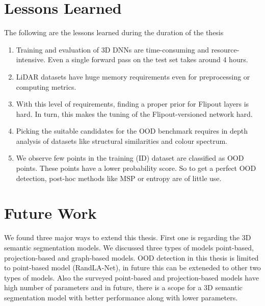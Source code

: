     \section{Lessons Learned}
    The following are the lessons learned during the duration of the thesis
    \begin{enumerate}
        \item Training and evaluation of 3D DNNs are time-consuming and resource-intensive. Even a single forward pass on the test set takes around 4 hours.
        \item LiDAR datasets have huge memory requirements even for preprocessing or computing metrics.
        \item With this level of requirements, finding a proper prior for Flipout layers is hard. In turn, this makes the tuning of the Flipout-versioned network hard.
        \item Picking the suitable candidates for the OOD benchmark requires in depth analysis of datasets like structural similarities and colour spectrum.
        \item We observe few points in the training (ID) dataset are classified as OOD points. These points have a lower probability score. So to get a perfect OOD detection, post-hoc methods like MSP or entropy are of little use.
    \end{enumerate}

    \section{Future Work}
    
    We found three major ways to extend this thesis. 
    First one is regarding the 3D semantic segmentation models.
    We discussed three types of models point-based, projection-based and graph-based models.
    OOD detection in this thesis is limited to point-based model (RandLA-Net), in future this can be exteneded to other two types of models.
    Also the surveyed point-based and projection-based models have high number of parameters and in future, there is a scope for a 3D semantic segmentation model with better performance along with lower parameters.

